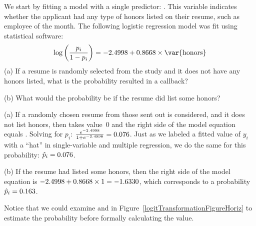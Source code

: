 \begin{examplewrap}
\begin{nexample}{We start by fitting a model with a single
    predictor: .
    This variable indicates whether the applicant had any
    type of honors listed on their resume,
    such as employee of the month.
    The following logistic regression model was fit using
    statistical software:
    \begin{align*}
    \log\left( \frac{p_i}{1-p_i} \right)
      = \resHonorsInt{} +
          \resHonorsCoef{} \times\text{\var{honors}}
    \end{align*}
    (a) If a resume is randomly selected from the study
    and it does not have any honors listed,
    what is the probability resulted in a callback?
    
    (b) What would the probability be if the resume did
    list some honors?}
    \label{logisticExampleWithHonors}%
  (a) If a randomly chosen resume from those sent out is considered,
  and it does not list honors, then  takes
  value~0 and the right side of the model equation equals
  \resHonorsInt{}.
  Solving for $p_i$:
  $\frac{e^{-2.4998{}}}{1 + e^{-2.4998{}}}
      = 0.076{}$.
  Just as we labeled a fitted value of $y_i$ with a ``hat''
  in single-variable and multiple regression, we do the same
  for this probability: $\hat{p}_i = 0.076{}$.

  (b) If the resume had listed some honors,
  then the right side of the model equation is
  $-2.4998{} + 0.8668{} \times 1
      = -1.6330{}$,
  which corresponds to a probability
  $\hat{p}_i = 0.163{}$.

  Notice that we could examine \resHonorsInt{} and
  \resHonorsIntPlusCoef{} in
  Figure~\ref{logitTransformationFigureHoriz}
  to estimate the probability before formally calculating
  the value.
\end{nexample}
\end{examplewrap}


